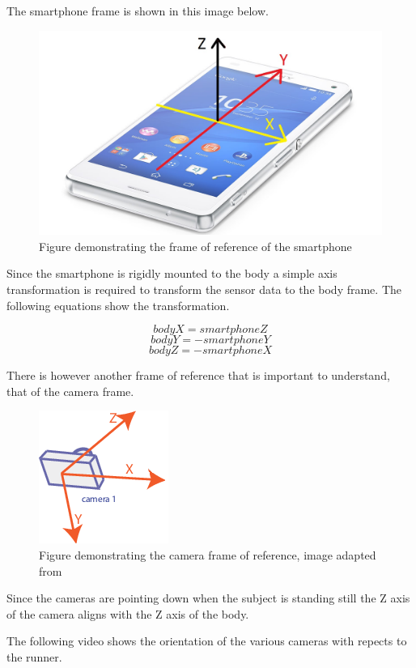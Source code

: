 The smartphone frame is shown in this image below.
\begin{figure}[!ht] 
\captionsetup{width=0.8\linewidth, font=small}  
\includegraphics[width=0.5\linewidth]{figures/phone.jpg}
\caption{Figure demonstrating the frame of reference of the smartphone}
\label{fig:phone}
\end{figure}

Since the smartphone is rigidly mounted to the body a simple axis transformation is required to transform the sensor data to the body frame. The following equations show the transformation.

$$ bodyX = smartphoneZ  $$
$$ bodyY = -smartphoneY  $$
$$ bodyZ = -smartphoneX  $$

There is however another frame of reference that is important to understand, that of the camera frame.

\begin{figure}[!ht] 
\captionsetup{width=0.8\linewidth, font=small}  
\includegraphics[width=0.5\linewidth]{figures/cf.png}
\caption{Figure demonstrating the camera frame of reference, image adapted from \cite{matlab}}
\label{fig:cf}
\end{figure}

Since the cameras are pointing down when the subject is standing still the Z axis of the camera aligns with the Z axis of the body. 


The following video shows the orientation of the various cameras with repects to the runner.



